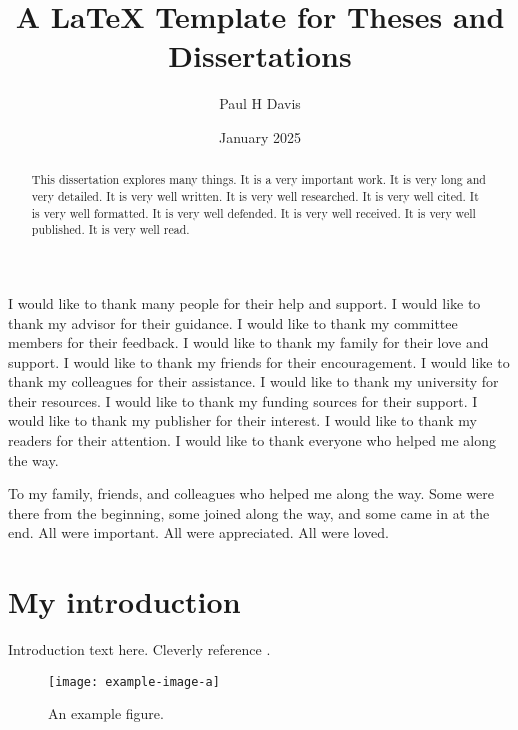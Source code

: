 \documentclass{thesis-dissertation}
\title{A \LaTeX{} Template for Theses and Dissertations}
\author{Paul H Davis}
\date{January 2025}             %
\begin{document}
\maketitlepage

\begin{abstract}
  This dissertation explores many things. It is a very important work. It is very long and very detailed. It is very well written. It is very well researched. It is very well cited. It is very well formatted. It is very well defended. It is very well received. It is very well published. It is very well read.
\end{abstract}

\begin{acknowledgments}
I would like to thank many people for their help and support. I would like to thank my advisor for their guidance. I would like to thank my committee members for their feedback. I would like to thank my family for their love and support. I would like to thank my friends for their encouragement. I would like to thank my colleagues for their assistance. I would like to thank my university for their resources. I would like to thank my funding sources for their support. I would like to thank my publisher for their interest. I would like to thank my readers for their attention. I would like to thank everyone who helped me along the way.
\end{acknowledgments}

\begin{dedication}
  To my family, friends, and colleagues who helped me along the way. Some were there from the beginning, some joined along the way, and some came in at the end. All were important. All were appreciated. All were loved.
\end{dedication}

\singlespacing
\tableofcontents
\listoffigures
\listoftables

\newpage{}
\doublespacing

\chapter{My introduction}
Introduction text here. Cleverly reference \cite{doe2023example}.

\lipsum[1-2] %

\begin{figure}
  \centering
  \texttt{[image: example-image-a]}
  \caption{An example figure.}
  \label{fig:example-image-a}
\end{figure}
\end{document}
